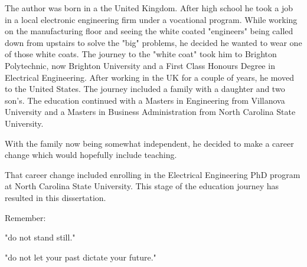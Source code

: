 \begin{biography}
The author was born in a the United Kingdom.  After high school he took a job in a local electronic engineering firm
under a vocational program.
While working on the manufacturing floor and seeing the white coated "engineers" being called down from upstairs to solve the "big" problems, he decided he wanted to wear one
of those white coats.
The journey to the "white coat" took him to Brighton Polytechnic, now Brighton University and a First Class Honours Degree in Electrical Engineering.
After working in the UK for a couple of years, he moved to the United States.
The journey included a family with a daughter and two son's.
The education continued with a Masters in Engineering from Villanova University and a Masters in Business Administration from North
Carolina State University.

With the family now being somewhat independent, he decided to make a career change which would hopefully include teaching.

That career change included enrolling in the Electrical Engineering PhD program at North
Carolina State University. This stage of the education journey has resulted in this dissertation.




Remember:

"do not stand still."  

"do not let your past dictate your future."


\end{biography}

